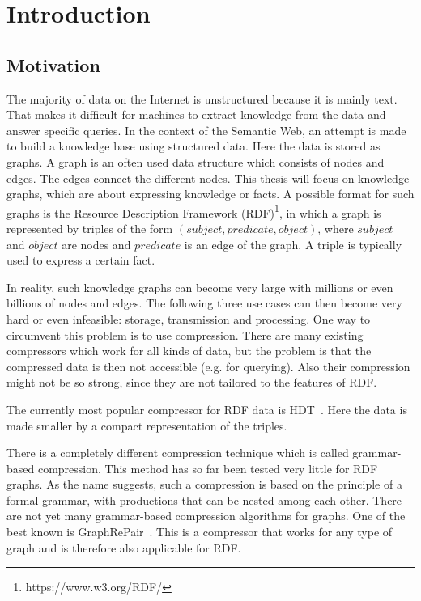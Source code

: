 \chapter{Introduction}\label{ch:introduction}

\section{Motivation}
The majority of data on the Internet is unstructured because it is mainly text. That makes it difficult for machines to extract knowledge from the data and answer specific queries. In the context of the Semantic Web, an attempt is made to build a knowledge base using structured data. Here the data is stored as graphs. A graph is an often used data structure which consists of nodes and edges. The edges connect the different nodes. This thesis will focus on knowledge graphs, which are about expressing knowledge or facts. A possible format for such graphs is the Resource Description Framework (RDF)\footnote{\label{foot:2}https://www.w3.org/RDF/}, in which a graph is represented by triples of the form $ (subject, predicate, object) $, where $ subject $ and $object$ are nodes and $predicate$ is an edge of the graph. A triple is typically used to express a certain fact.

In reality, such knowledge graphs can become very large with millions or even billions of nodes and edges.  The following three use cases can then become very hard or even infeasible: storage, transmission and processing. One way to circumvent this problem is to use compression. There are many existing compressors which work for all kinds of data, but the problem is that the compressed data is then not accessible (e.g. for querying). Also their compression might not be so strong, since they are not tailored to the features of RDF.

The currently most popular compressor for RDF data is HDT~\cite{hdt}. Here the data is made smaller by a compact representation of the triples. 

There is a completely different compression technique which is called grammar-based compression. This method has so far been tested very little for RDF graphs. As the name suggests, such a compression is based on the principle of a formal grammar, with productions that can be nested among each other. There are not yet many grammar-based compression algorithms for graphs. One of the best known is GraphRePair~\cite{maneth}. This is a compressor that works for any type of graph and is therefore also applicable for RDF.

